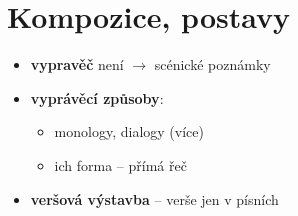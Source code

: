 \documentclass[10pt,a4paper]{article}
\newcommand{\ra}{$\rightarrow$ }
\begin{document}
\section*{Kompozice, postavy}
\begin{itemize}
\item \textbf{vypravěč} není \ra scénické poznámky
\item \textbf{vyprávěcí způsoby}:
	\begin{itemize}
	\item monology, dialogy (více)
	\item ich forma -- přímá řeč
	\end{itemize}
\item \textbf{veršová výstavba} -- verše jen v písních

\end{itemize}
\end{document}
